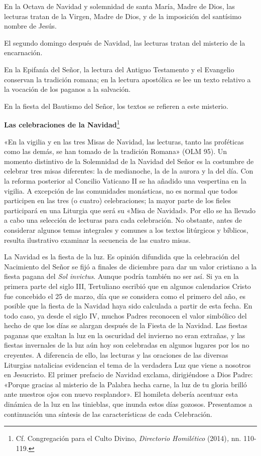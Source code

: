 \documentclass[]{article}
\begin{document}
En la Octava de Navidad y solemnidad de santa María, Madre de Dios, las
lecturas tratan de la Virgen, Madre de Dios, y de la imposición del
santísimo nombre de Jesús.

El segundo domingo después de Navidad, las lecturas tratan del misterio
de la encarnación.

En la Epifanía del Señor, la lectura del Antiguo Testamento y el
Evangelio conservan la tradición romana; en la lectura apostólica se lee
un texto relativo a la vocación de los paganos a la salvación.

En la fiesta del Bautismo del Señor, los textos se refieren a este
misterio.

\textbf{Las celebraciones de la Navidad}\footnote{Cf. Congregación para
  el Culto Divino, \emph{Directorio Homilético} (2014)\emph{,} nn.
  110-119.}

«En la vigilia y en las tres Misas de Navidad, las lecturas, tanto las
proféticas como las demás, se han tomado de la tradición Romana» (OLM
95). Un momento distintivo de la Solemnidad de la Navidad del Señor es
la costumbre de celebrar tres misas diferentes: la de medianoche, la de
la aurora y la del día. Con la reforma posterior al Concilio Vaticano II
se ha añadido una vespertina en la vigilia. A excepción de las
comunidades monásticas, no es normal que todos participen en las tres (o
cuatro) celebraciones; la mayor parte de los fieles participará en una
Liturgia que será su «Misa de Navidad». Por ello se ha llevado a cabo
una selección de lecturas para cada celebración. No obstante, antes de
considerar algunos temas integrales y comunes a los textos litúrgicos y
bíblicos, resulta ilustrativo examinar la secuencia de las cuatro misas.

La Navidad es la fiesta de la luz. Es opinión difundida que la
celebración del Nacimiento del Señor se fijó a finales de diciembre para
dar un valor cristiano a la fiesta pagana del \emph{Sol invictus}.
Aunque podría también no ser así. Si ya en la primera parte del siglo
III, Tertuliano escribió que en algunos calendarios Cristo fue concebido
el 25 de marzo, día que se considera como el primero del año, es posible
que la fiesta de la Navidad haya sido calculada a partir de esta fecha.
En todo caso, ya desde el siglo IV, muchos Padres reconocen el valor
simbólico del hecho de que los días se alargan después de la Fiesta de
la Navidad. Las fiestas paganas que exaltan la luz en la oscuridad del
invierno no eran extrañas, y las fiestas invernales de la luz aún hoy
son celebradas en algunos lugares por los no creyentes. A diferencia de
ello, las lecturas y las oraciones de las diversas Liturgias natalicias
evidencian el tema de la verdadera Luz que viene a nosotros en
Jesucristo. El primer prefacio de Navidad exclama, dirigiéndose a Dios
Padre: «Porque gracias al misterio de la Palabra hecha carne, la luz de
tu gloria brilló ante nuestros ojos con nuevo resplandor». El homileta
debería acentuar esta dinámica de la luz en las tinieblas, que inunda
estos días gozosos. Presentamos a continuación una síntesis de las
características de cada Celebración.
\end{document}
